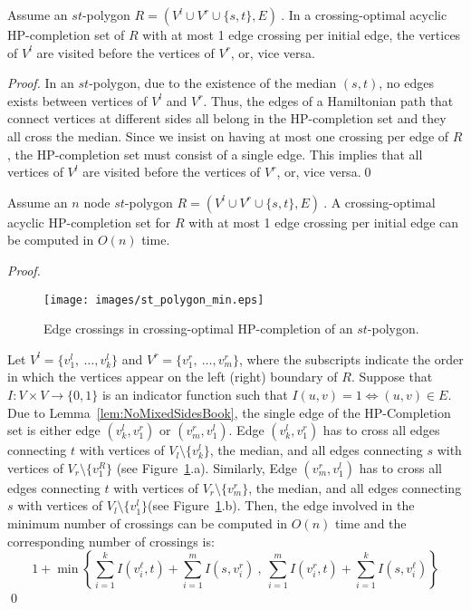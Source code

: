 \documentclass{myllncs-mixalis}
\newcommand{\eat}[1] {{}}
\begin{document}
\eat{ Let $R$ be an $st$-polygon $R=(V^l \cup V^r \cup \{s,t\}, E)~$
where $V_l$ and $V_r$ are the vertices to its left and right border,
respectively.
 }

\begin{lemma}
\label{lem:NoMixedSidesBook} Assume an $st$-polygon $R=(V^l \cup V^r
\cup \{s,t\}, E)~$. In a crossing-optimal acyclic HP-completion set
of $R$ with at most 1 edge crossing per initial edge,  the vertices
of
  $V^l$ are visited before the vertices of $V^r$, or, vice
  versa.
\end{lemma}

\begin{proof}
In an $st$-polygon, due to the existence of the median $(s,t)$, no
edges exists between vertices of $V^l$ and $V^r$. Thus, the edges of
a Hamiltonian path that connect vertices at different sides all
belong in the HP-completion set and they all cross the median. Since
we insist on having at most one crossing per edge of $R$, the
HP-completion set must consist of a single edge. This implies that
all vertices of $V^l$ are visited before the vertices of $V^r$, or,
vice versa.\qed
\end{proof}

\begin{lemma}
\label{lem:spineCrossingSTpolygon} Assume an $n$ node  $st$-polygon
$R=(V^l \cup V^r \cup \{s,t\}, E)~$. A crossing-optimal  acyclic
HP-completion set for $R$ with at most 1 edge crossing per initial
edge can be computed in $O(n)$ time.
\end{lemma}

\begin{proof}
\begin{figure}[htb]
    \centering
    \texttt{[image: images/st\_polygon\_min.eps]}
    \caption{Edge crossings in crossing-optimal HP-completion of an $st$-polygon.}
    \label{fig:HPcompletionPolygon}
\end{figure}

Let $V^l = \{ v^l_1,~\ldots, v^l_k\}$ and $V^r = \{  v^r_1,~\ldots,
v^r_m\}$, where the subscripts indicate the order in which the
vertices appear on the left (right) boundary of $R$. Suppose that
$I:V \times V \rightarrow \{0,1\}$ is an indicator function such
that $I(u,v)=1 \iff (u,v) \in E$. Due to
Lemma~\ref{lem:NoMixedSidesBook}, the single edge of the
HP-Completion set is either edge $(v^l_k, v^r_1)$ or $(v^r_m,
v^l_1)$. Edge $(v^l_k, v^r_1)$ has to cross  all edges connecting
$t$ with vertices of $V_l \setminus \{v^l_k\} $, the median, and all
edges connecting $s$ with vertices of $V_r\setminus \{v^R_1\}$ (see
Figure~\ref{fig:HPcompletionPolygon}.a). Similarly, Edge $(v^r_m,
v^l_1)$ has to cross  all edges connecting $t$ with vertices of $V_r
\setminus \{v^r_m\}$, the median, and all  edges connecting $s$ with
vertices of $V_l\setminus \{v^l_1\}$(see
Figure~\ref{fig:HPcompletionPolygon}.b). Then, the edge involved in
the minimum number of crossings can be computed in $O(n)$ time and
the corresponding number of crossings is:
$$1 + \min\left\{  \sum_{i=1}^{k}{I(v^\ell_i,t)}+\sum_{i=1}^{m}{I(s,v^r_i)}~,
             ~\sum_{i=1}^{m}{I(v^r_i,t)}    +\sum_{i=1}^{k}{I(s,v^\ell_i)}\right\}$$
\qed
\end{proof}
\end{document}
